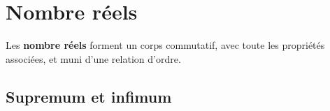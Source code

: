 \section{Nombre réels}
\begin{defi}
Les \textbf{nombre réels} forment un corps commutatif, avec toute les propriétés associées, et muni
d'une relation d'ordre. 
\end{defi}

\subsection{Supremum et infimum}

